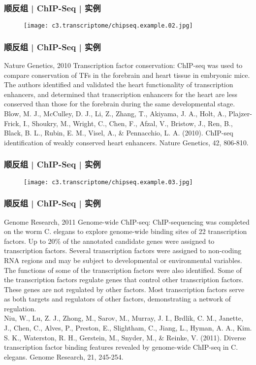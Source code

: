 \begin{frame}
  \frametitle{顺反组 | ChIP-Seq | 实例}
  \begin{figure}
    \centering
    \texttt{[image: c3.transcriptome/chipseq.example.02.jpg]}
  \end{figure}
\end{frame}

\begin{frame}
  \frametitle{顺反组 | ChIP-Seq | 实例}
  \begin{block}{Nature Genetics, 2010}
  Transcription factor conservation: ChIP-seq was used to compare conservation of TFs in the forebrain and heart tissue in embryonic mice. The authors identified and validated the heart functionality of transcription enhancers, and determined that transcription enhancers for the heart are less conserved than those for the forebrain during the same developmental stage.\\
  \vspace{0.5em}
  Blow, M. J., McCulley, D. J., Li, Z., Zhang, T., Akiyama, J. A., Holt, A., Plajzer-Frick, I., Shoukry, M., Wright, C., Chen, F., Afzal, V., Bristow, J., Ren, B., Black, B. L., Rubin, E. M., Visel, A., \& Pennacchio, L. A. (2010). ChIP-seq identification of weakly conserved heart enhancers. Nature Genetics, 42, 806-810.
  \end{block}
\end{frame}

\begin{frame}
  \frametitle{顺反组 | ChIP-Seq | 实例}
  \begin{figure}
    \centering
    \texttt{[image: c3.transcriptome/chipseq.example.03.jpg]}
  \end{figure}
\end{frame}

\begin{frame}
  \frametitle{顺反组 | ChIP-Seq | 实例}
  {\footnotesize
  \begin{block}{Genome Research, 2011}
  Genome-wide ChIP-seq: ChIP-sequencing was completed on the worm C. elegans to explore genome-wide binding sites of 22 transcription factors. Up to 20\% of the annotated candidate genes were assigned to transcription factors. Several transcription factors were assigned to non-coding RNA regions and may be subject to developmental or environmental variables. The functions of some of the transcription factors were also identified. Some of the transcription factors regulate genes that control other transcription factors. These genes are not regulated by other factors. Most transcription factors serve as both targets and regulators of other factors, demonstrating a network of regulation.\\
  \vspace{0.5em}
  Niu, W., Lu, Z. J., Zhong, M., Sarov, M., Murray, J. I., Brdlik, C. M., Janette, J., Chen, C., Alves, P., Preston, E., Slightham, C., Jiang, L., Hyman, A. A., Kim. S. K., Waterston, R. H., Gerstein, M., Snyder, M., \& Reinke, V. (2011). Diverse transcription factor binding features revealed by genome-wide ChIP-seq in C. elegans. Genome Research, 21, 245-254.
  \end{block}
}
\end{frame}

